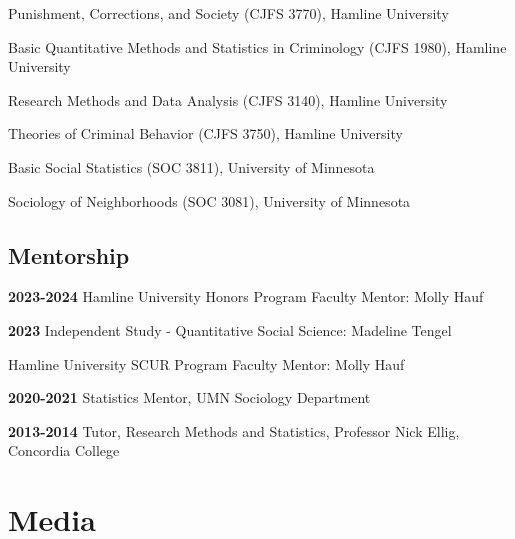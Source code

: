 \documentclass[letterpaper]{article}
\newenvironment{publist}{%
  \begin{list}{}{%
    \setlength{\leftmargin}{0cm}   %
    \setlength{\labelwidth}{2cm}     %
    \setlength{\labelsep}{0.5cm}     %
  }%
}{%
  \end{list}%
}
\begin{document}
\begin{publist} 

\item Punishment, Corrections, and Society (CJFS 3770), Hamline University
\item Basic Quantitative Methods and Statistics in Criminology (CJFS 1980), Hamline University
\item Research Methods and Data Analysis (CJFS 3140), Hamline University
\item Theories of Criminal Behavior (CJFS 3750), Hamline University
\item Basic Social Statistics (SOC 3811), University of Minnesota
\item Sociology of Neighborhoods (SOC 3081), University of Minnesota

\end{publist}


\subsection*{Mentorship}

\begin{publist}

\item[\textbf{2023-2024}] Hamline University Honors Program Faculty Mentor: Molly Hauf
\item[\textbf{2023}] Independent Study - Quantitative Social Science: Madeline Tengel 
\item Hamline University SCUR Program Faculty Mentor: Molly Hauf
\item[\textbf{2020-2021}] Statistics Mentor, UMN Sociology Department
\item[\textbf{2013-2014}] Tutor, Research Methods and Statistics, Professor Nick Ellig, Concordia College

\end{publist}

\section*{\textbf{Media}}
\end{document}
